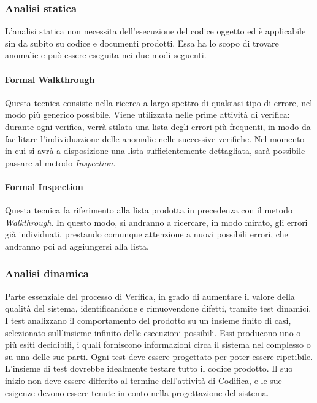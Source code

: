 	\subsubsection{Analisi statica}
	L'analisi statica non necessita dell'esecuzione del codice oggetto ed è applicabile sin da subito su codice e documenti prodotti. Essa ha lo scopo di trovare anomalie e può essere eseguita nei due modi seguenti.
	
	\paragraph{Formal Walkthrough}
	Questa tecnica consiste nella ricerca a largo spettro di qualsiasi tipo di errore, nel modo più generico possibile. 
	Viene utilizzata nelle prime attività di verifica: durante ogni verifica, verrà stilata una lista degli errori più frequenti, in modo da facilitare l’individuazione delle anomalie nelle successive verifiche. 
	Nel momento in cui si avrà a disposizione una lista sufficientemente dettagliata, sarà possibile passare al metodo \textit{Inspection}.
	
	\paragraph{Formal Inspection}
	Questa tecnica fa riferimento alla lista prodotta in precedenza con il metodo \textit{Walkthrough}. In questo modo, si andranno a ricercare, in modo mirato, gli errori già individuati, prestando comunque attenzione a nuovi possibili errori, che andranno poi ad aggiungersi alla lista.
	
	\subsubsection{Analisi dinamica}
	Parte essenziale del processo di Verifica, in grado di aumentare il valore della qualità del sistema, identificandone e rimuovendone difetti, tramite test dinamici. I test analizzano il comportamento del prodotto su un insieme finito di casi, selezionato sull'insieme infinito delle esecuzioni possibili. Essi producono uno o più esiti decidibili, i quali forniscono informazioni circa il sistema nel complesso o su una delle sue parti. Ogni test deve essere progettato per poter essere ripetibile. L'insieme di test dovrebbe idealmente testare tutto il codice prodotto. Il suo inizio non deve essere differito al termine dell'attività di Codifica, e le sue esigenze devono essere tenute in conto nella progettazione del sistema.	
	